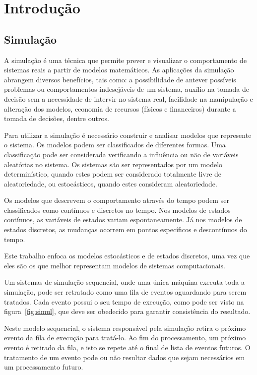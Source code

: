 \chapter{Introdução}
\section{Simulação}

A simulação é uma técnica que permite prever e visualizar o comportamento de sistemas reais a partir de modelos matemáticos. As aplicações da simulação abrangem diversos benefícios, tais como: a possibilidade de antever possíveis problemas ou comportamentos indesejáveis de um sistema, auxílio na tomada de decisão sem a necessidade de intervir no sistema real, facilidade na manipulação e alteração dos modelos, economia de recursos (físicos e financeiros) durante a tomada de decisões, dentre outros.

Para utilizar a simulação é necessário construir e analisar modelos que represente o sistema. Os modelos podem ser classificados de diferentes formas. Uma classificação pode ser considerada verificando a influência ou não de variáveis aleatórias no sistema. Os sistemas são ser representados por um modelo determinístico, quando estes podem ser considerado totalmente livre de aleatoriedade, ou estocásticos, quando estes consideram aleatoriedade.

Os modelos que descrevem o comportamento através do tempo podem ser classificados como contínuos e discretos no tempo. Nos modelos de estados contínuos, as variáveis de estados variam espontaneamente. Já nos modelos de estados discretos, as mudanças ocorrem em pontos específicos e descontínuos do tempo.

Este trabalho enfoca os modelos estocásticos e de estados discretos, uma vez que eles são os que melhor representam modelos de sistemas computacionais.

Um sistemas de simulação sequencial, onde uma única máquina executa toda a simulação, pode ser retratado como uma fila de eventos aguardando para serem tratados. Cada evento possui o seu tempo de execução, como pode ser visto na figura~\ref{fig:simul}, que deve ser obedecido para garantir consistência do resultado.

Neste modelo sequencial, o sistema responsável pela simulação retira o próximo evento da fila de execução para tratá-lo. Ao fim do processamento, um próximo evento é retirado da fila, e isto se repete até o final de lista de eventos futuros. O tratamento de um evento pode ou não resultar dados que sejam necessários em um processamento futuro.

